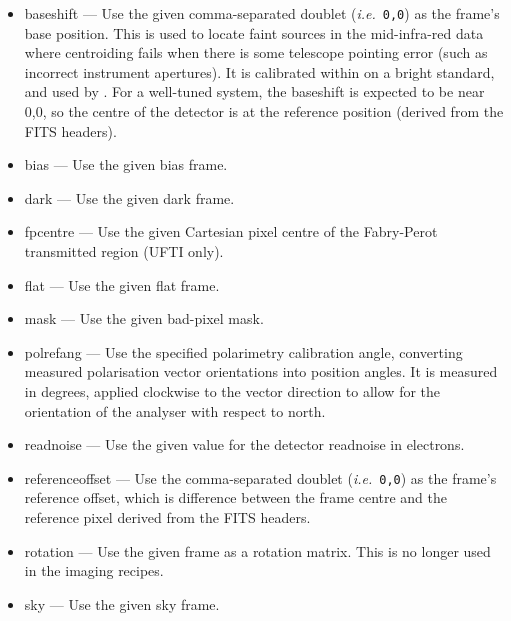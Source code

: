 \documentclass[twoside,11pt,nolof]{starlink}
\begin{document}
\begin{itemize}

\item baseshift --- Use the given comma-separated doublet (\emph{{i.e.}}\ \texttt{0,0}) as the
frame's base position.  This is used to locate faint sources in the
mid-infra-red data where centroiding fails when there is some
telescope pointing error (such as incorrect instrument apertures).  It
is calibrated within  on a
bright standard, and used by
.  For a well-tuned
system, the baseshift is expected to be near 0,0, so the centre of the
detector is at the reference position (derived from the FITS headers).

\item bias --- Use the given bias frame.

\item dark --- Use the given dark frame.

\item fpcentre --- Use the given Cartesian pixel centre of the
Fabry-Perot transmitted region (UFTI only).

\item flat --- Use the given flat frame.

\item mask --- Use the given bad-pixel mask.

\item polrefang --- Use the specified polarimetry calibration angle,
converting measured polarisation vector orientations into position angles.
It is measured in degrees, applied clockwise to the vector direction
to allow for the orientation of the analyser with respect to north.

\item readnoise --- Use the given value for the detector readnoise in
electrons.

\item referenceoffset --- Use the comma-separated doublet
(\emph{{i.e.}}\ \texttt{0,0}) as the frame's reference offset, which is
difference between the frame centre and the reference pixel derived
from the FITS headers.

\item rotation --- Use the given frame as a rotation matrix.  This is
no longer used in the imaging recipes.

\item sky --- Use the given sky frame.

\end{itemize}
\end{document}
